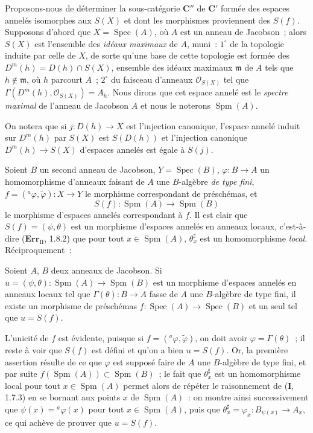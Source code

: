 \begin{env}[10.9.3]
\label{IV.10.9.3-fr}
Proposons-nous de déterminer la sous-catégorie $\boldsymbol{C}''$ de $\boldsymbol{C}'$
formée des espaces annelés isomorphes aux $S(X)$ et dont les morphismes
proviennent des $S(f)$. Supposons d'abord que $X=\operatorname{Spec}(A)$, où
$A$ est un anneau de Jacobson~; alors $S(X)$ est l'ensemble des \emph{idéaux
maximaux} de $A$, muni~: $1^\circ$ de la topologie induite par celle de $X$, de
sorte qu'une base de cette topologie est formée des
$D^m(h)=D(h)\cap S(X)$, ensemble des idéaux maximaux $\mathfrak m$ de $A$ tels
que $h\notin\mathfrak m$, où $h$ parcourt $A$~; $2^\circ$ du faisceau d'anneaux
$\mathcal O_{S(X)}$ tel que
$\Gamma(D^m(h),\mathcal O_{S(X)})=A_h$. Nous dirons que cet espace annelé est
le \emph{spectre maximal} de l'anneau de Jacobson $A$ et nous le noterons
$\operatorname{Spm}(A)$.

On notera que si $j:D(h)\to X$ est l'injection canonique, l'espace annelé
induit sur $D^m(h)$ par $S(X)$ est $S(D(h))$ et l'injection canonique
$D^m(h)\to S(X)$ d'espaces annelés est égale à $S(j)$.

Soient $B$ un second anneau de Jacobson, $Y=\operatorname{Spec}(B)$,
$\varphi:B\to A$ un homomorphisme d'anneaux faisant de $A$ une $B$-algèbre \emph{de
type fini}, $f=({}^a\varphi,\widetilde\varphi):X\to Y$ le morphisme
correspondant de préschémas, et
\[
  S(f):\operatorname{Spm}(A)\longrightarrow\operatorname{Spm}(B)
\]
le morphisme d'espaces annelés correspondant à $f$. Il est clair que
$S(f)=(\psi,\theta)$ est un morphisme d'espaces annelés en anneaux locaux,
c'est-à-dire ($\mathbf{Err}_{\mathrm{II}}$, 1.8.2) que pour tout
$x\in\operatorname{Spm}(A)$, $\theta_x^\sharp$ est un homomorphisme \emph{local}.
Réciproquement~:
\end{env}

\begin{proposition}[10.9.4]
\label{IV.10.9.4-fr}
Soient $A$, $B$ deux anneaux de Jacobson. Si
$u=(\psi,\theta):\operatorname{Spm}(A)\to\operatorname{Spm}(B)$ est un
morphisme d'espaces annelés en anneaux locaux tel que
$\Gamma(\theta):B\to A$ fasse de $A$ une $B$-algèbre de type fini, il existe
un morphisme de préschémas
$f:\operatorname{Spec}(A)\to\operatorname{Spec}(B)$ et un seul tel que
$u=S(f)$.
\end{proposition}

L'unicité de $f$ est évidente, puisque si
$f=({}^a\varphi,\widetilde\varphi)$, on doit avoir
$\varphi=\Gamma(\theta)$~; il reste à voir que $S(f)$ est défini et qu'on a
bien $u=S(f)$. Or, la première assertion résulte de ce que $\varphi$ est
supposé faire de $A$ une $B$-algèbre de type fini, et par suite
$f(\operatorname{Spm}(A))\subset\operatorname{Spm}(B)$~; le fait que
$\theta_x^\sharp$ est un homomorphisme local pour tout
$x\in\operatorname{Spm}(A)$ permet alors de répéter le raisonnement de
(\textbf I, 1.7.3) en se bornant aux points $x$ de $\operatorname{Spm}(A)$~:
on montre ainsi successivement que $\psi(x)={}^a\varphi(x)$ pour tout
$x\in\operatorname{Spm}(A)$, puis que
$\theta_x^\sharp=\varphi_x:B_{\psi(x)}\to A_x$, ce qui achève de prouver que
$u=S(f)$.

